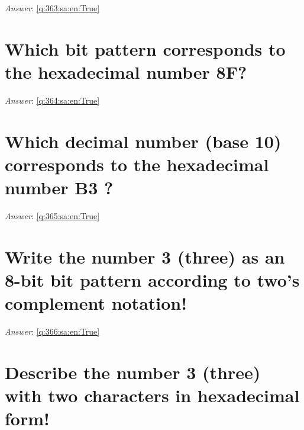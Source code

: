 \documentclass[a4paper,11pt,oneside]{book}
\begin{document}
\begin{sloppypar}
\textit{Answer}: \autoref{q:363:sa:en:True}



\section{Which bit pattern corresponds to the hexadecimal number 8F?}

\label{q:364:sa:en:False}

\vspace{2cm}

\noindent\makebox[\textwidth]{\hrulefill}

\vspace{1cm}

\textit{Answer}: \autoref{q:364:sa:en:True}



\section{Which decimal number (base 10) corresponds to the hexadecimal number  B3 ?}

\label{q:365:sa:en:False}

\vspace{2cm}

\noindent\makebox[\textwidth]{\hrulefill}

\vspace{1cm}

\textit{Answer}: \autoref{q:365:sa:en:True}



\section{Write the number 3 (three) as an 8-bit bit pattern according to two's complement notation!}

\label{q:366:sa:en:False}

\vspace{2cm}

\noindent\makebox[\textwidth]{\hrulefill}

\vspace{1cm}

\textit{Answer}: \autoref{q:366:sa:en:True}



\section{Describe the number 3 (three) with two characters in hexadecimal form!}


\end{sloppypar}
\end{document}
